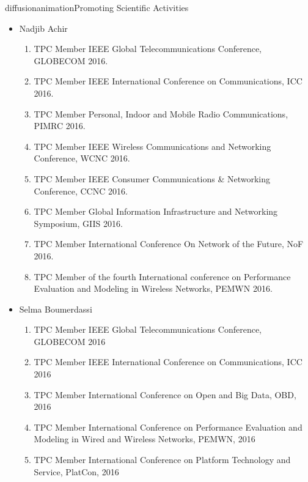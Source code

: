 \documentclass{ra2016}
\begin{document}
\begin{module}{diffusion}{animation}{Promoting Scientific Activities}
\begin{itemize}
\begin{enumerate}
            \item TPC Member IFIP/IEEE International Symposium on Integrated Network Management, workshop on Future Networks for Secure Smart Cities (FNSSC), 2017.
            \item TPC Member IEEE International Conference on Communications (ICC), Selected Areas in Communications (SAC), 2015, 2016, 2017.
            \item TPC Member IEEE International Conference on Telecommunications (ICT), Thessaloniki, Greece, 16-18 May 2016.
            \item TPC Member IEEE International Symposium on Personal, Indoor and Mobile Radio Communications (PIMRC), 2008, 2009, 2013, 2016.
            \item TPC Member International Conference on Embedded Wireless Systems and Networks (EWSN), 2016.
        \end{enumerate}
    \item Nadjib Achir
        \begin{enumerate}
            \item TPC Member IEEE Global Telecommunications Conference, GLOBECOM 2016.
            \item TPC Member IEEE International Conference on Communications, ICC 2016.
            \item TPC Member Personal, Indoor and Mobile Radio Communications, PIMRC 2016.
            \item TPC Member IEEE Wireless Communications and Networking Conference, WCNC 2016.
            \item TPC Member IEEE Consumer Communications \& Networking Conference, CCNC 2016.
            \item TPC Member Global Information Infrastructure and Networking Symposium, GIIS 2016.               
            \item TPC Member International Conference On Network of the Future, NoF 2016.     
            \item TPC Member of the fourth International conference on Performance Evaluation and Modeling in Wireless Networks, PEMWN 2016.     
        \end{enumerate}
    \item Selma Boumerdassi
        \begin{enumerate}
            \item TPC Member IEEE Global Telecommunications Conference, GLOBECOM 2016
            \item TPC Member IEEE International Conference on Communications, ICC 2016
            \item TPC Member International Conference on Open and Big Data, OBD, 2016
            \item TPC Member International Conference on Performance Evaluation and Modeling in Wired and Wireless Networks, PEMWN, 2016
            \item TPC Member International Conference on Platform Technology and Service, PlatCon, 2016
        \end{enumerate}
\end{itemize}


\end{module}
\end{document}
